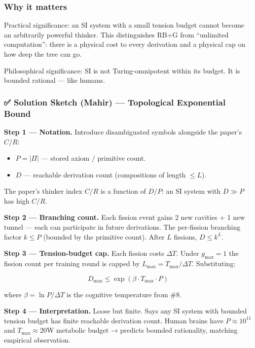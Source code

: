 \documentclass[
  11pt,
  a4paper,
]{article}
\providecommand{\tightlist}{%
  \setlength{\itemsep}{0pt}\setlength{\parskip}{0pt}}
\begin{document}
\subsubsection{Why it matters}\label{why-it-matters-2}

Practical significance: an SI system with a small tension budget cannot
become an arbitrarily powerful thinker. This distinguishes RB+G from
``unlimited computation'': there is a physical cost to every derivation
and a physical cap on how deep the tree can go.

Philosophical significance: SI is not Turing-omnipotent within its
budget. It is bounded rational --- like humans.

\subsubsection{✅ Solution Sketch (Mahir) --- Topological Exponential
Bound}\label{solution-sketch-mahir-topological-exponential-bound}

\textbf{Step 1 --- Notation.} Introduce disambiguated symbols alongside
the paper's \(C/R\):

\begin{itemize}
\tightlist
\item
  \(P = |\Pi|\) --- stored axiom / primitive count.
\item
  \(D\) --- reachable derivation count (compositions of length
  \(\leq L\)).
\end{itemize}

The paper's thinker index \(C/R\) is a function of \(D/P\): an SI system
with \(D \gg P\) has high \(C/R\).

\textbf{Step 2 --- Branching count.} Each fission event gains 2 new
cavities + 1 new tunnel --- each can participate in future derivations.
The per-fission branching factor \(k \leq P\) (bounded by the primitive
count). After \(L\) fissions, \(D \leq k^L\).

\textbf{Step 3 --- Tension-budget cap.} Each fission costs \(\Delta T\).
Under \(g_\text{max}=1\) the fission count per training round is capped
by \(L_\text{max} = T_\text{max}/\Delta T\). Substituting:

\[
\boxed{D_\text{max} \leq \exp\!\left(\beta \cdot T_\text{max} \cdot P\right)}
\]

where \(\beta = \ln P / \Delta T\) is the cognitive temperature from
\#8.

\textbf{Step 4 --- Interpretation.} Loose but finite. Says any SI system
with bounded tension budget has finite reachable derivation count. Human
brains have \(P \approx 10^{11}\) and \(T_\text{max} \approx 20\)W
metabolic budget → predicts bounded rationality, matching empirical
observation.
\end{document}
